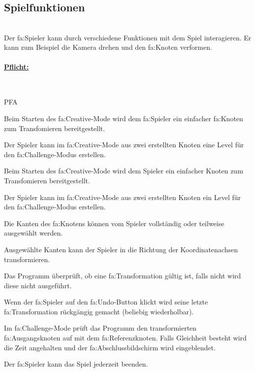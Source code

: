 %
%


\subsection{Spielfunktionen}

%
%
\renewcommand{\K}{}
%
%

~\\
Der \gls{fa:Spieler} kann durch verschiedene Funktionen mit dem Spiel interagieren. Er kann zum Beispiel die Kamera drehen und den \gls{fa:Knoten} verformen. 
\\

%
%
\paragraph*{\underline{Pflicht:}}~\\

\begin{ids}{\gls{PFA\K}}

	\id[ 90] Beim Starten des \gls{fa:Creative}-Mode wird dem \gls{fa:Spieler} ein einfacher \gls{fa:Knoten} zum Transfomieren bereitgestellt.
	
 	\id[100] Der Spieler kann im \gls{fa:Creative}-Mode aus zwei erstellten Knoten eine Level für den \gls{fa:Challenge}-Modus erstellen.
 	
 	\id[ 110] Beim Starten des \gls{fa:Creative}-Mode wird dem Spieler ein einfacher Knoten  zum Transfomieren bereitgestellt.
 	
 	\id[ 120] Der Spieler kann im \gls{fa:Creative}-Mode aus zwei erstellten Knoten ein Level für den \gls{fa:Challenge}-Modus erstellen.
 	
 	\id[ 130] Die Kanten des \gls{fa:Knoten}s können vom Spieler vollständig oder teilweise ausgewählt werden.
 	
 	\id[ 140] Ausgewählte Kanten kann der Spieler in die Richtung der Koordinatenachsen transformieren.
 	
 	\id[ 150] Das Programm überprüft, ob eine \gls{fa:Transformation} gültig ist, falls nicht wird diese nicht ausgeführt.
 	
 	\id[ 160] Wenn der \gls{fa:Spieler} auf den \gls{fa:Undo}-Button klickt wird seine letzte \gls{fa:Transformation} rückgängig gemacht (beliebig wiederholbar). 
 	
 	\id[ 170] Im \gls{fa:Challenge}-Mode prüft das Programm den transformierten \gls{fa:Ausgangsknoten} auf mit dem \gls{fa:Referenzknoten}. Falls Gleichheit besteht wird die Zeit angehalten und der \gls{fa:Abschlussbildschirm} wird eingeblendet.
 	
 	\id[ 180] Der \gls{fa:Spieler} kann das Spiel jederzeit beenden.
	
\end{ids}


